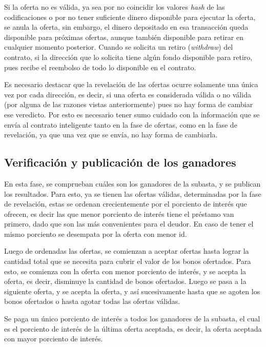    Si la oferta no es válida, ya sea por no coincidir los valores \textit{hash} de las codificaciones o por no tener suficiente 
    dinero disponible para ejecutar la oferta, se anula la oferta, sin embargo, el dinero depositado en esa transacción queda disponible
    para próximas ofertas, aunque también disponible para retirar en cualquier momento posterior. Cuando se solicita un retiro 
    (\textit{withdraw}) del contrato, si la dirección que lo solicita tiene algún fondo disponible para retiro, pues recibe el reembolso
    de todo lo disponible en el contrato.

    Es necesario destacar que la revelación de las ofertas ocurre solamente una única vez por cada dirección, es decir, si una oferta
    es considerada válida o no válida (por alguna de las razones vistas anteriormente) pues no hay forma de cambiar ese veredicto. Por 
    esto es necesario tener sumo cuidado con la información que se envía al contrato inteligente tanto en la fase de ofertas, como en
    la fase de revelación, ya que una vez que se envía, no hay forma de cambiarla.

  \subsection{Verificación y publicación de los ganadores}
    En esta fase, se comprueban cuáles son los ganadores de la subasta, y se publican los resultados. Para esto, ya se tienen las ofertas
    válidas, determinadas por la fase de revelación, estas se ordenan crecientemente por el porciento de interés que ofrecen, es decir
    las que menor porciento de interés tiene el préstamo van primero, dado que son las más convenientes para el deudor. En caso de tener
    el mismo porciento se desempata por la oferta con menor id. 

    Luego de ordenadas las ofertas, se comienzan a aceptar ofertas hasta lograr la cantidad total que se necesita para cubrir el valor
    de los bonos ofertados. Para esto, se comienza con la oferta con menor porciento de interés, 
    y se acepta la oferta, es decir, disminuye la cantidad de bonos ofertados. Luego se pasa a la siguiente oferta, y se acepta la oferta, 
    y así sucesivamente hasta que se agoten los bonos ofertados o hasta agotar todas las ofertas válidas.

    Se paga un único porciento de interés a todos los ganadores de la subasta, el cual es el porciento de interés de la última oferta
    aceptada, es decir, la oferta aceptada con mayor porciento de interés.

